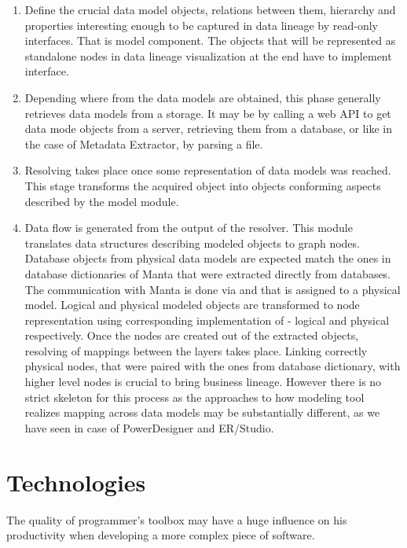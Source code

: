 \begin{enumerate}
	\item Define the crucial data model objects, relations between them, hierarchy and properties interesting enough to be captured in data lineage by read-only interfaces. That is model component. 
	The objects that will be represented as standalone nodes in data lineage visualization at the end have to implement  interface.
	\item Depending where from the data models are obtained, this phase generally retrieves data models from a storage. It may be by calling a web API to get data mode objects from a server, retrieving them from a database, or like in the case of Metadata Extractor, by parsing a file.
	\item Resolving takes place once some representation of data models was reached. This stage transforms the acquired object into objects conforming aspects described by the model module.
	\item Data flow is generated from the output of the resolver. This module translates data structures describing modeled objects to graph nodes. 
	Database objects from physical data models are expected match the ones in database dictionaries of Manta that were extracted directly from databases. 
	The communication with Manta is done via  and  that is assigned to a physical model.
	Logical and physical modeled objects are transformed to node representation using corresponding implementation of  - logical and physical respectively.
	Once the nodes are created out of the extracted objects, resolving of mappings between the layers takes place.
	Linking correctly physical nodes, that were paired with the ones from database dictionary, with higher level nodes is crucial to bring business lineage. 
	However there is no strict skeleton for this process as the approaches to how modeling tool realizes mapping across data models may be substantially different, as we have seen in case of PowerDesigner and ER/Studio.
\end{enumerate} 

\section{Technologies}

The quality of programmer's toolbox may have a huge influence on his productivity when developing a more complex piece of software.

